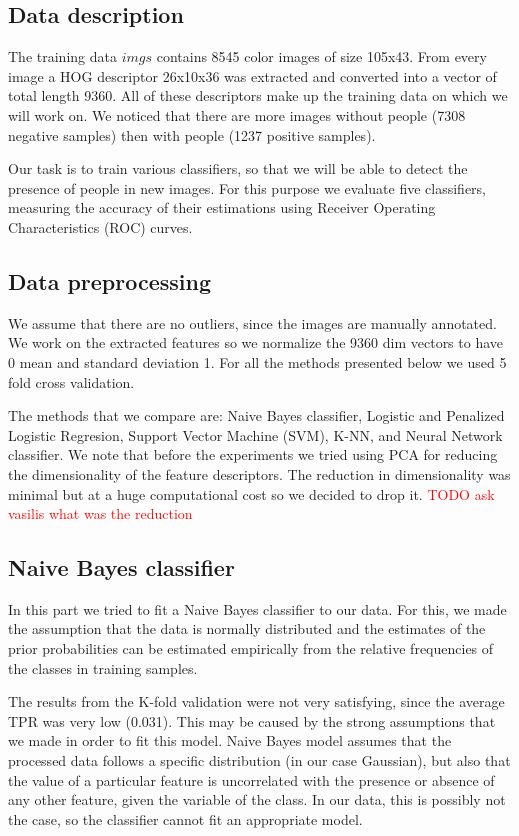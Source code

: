 \subsection{Data description}
The training data $imgs$ contains 8545 color images of size 105x43. From every image a HOG descriptor 26x10x36 was extracted and converted into a vector of total length 9360. All of these descriptors make up the training data on which we will work on.  We noticed that there are more images without people (7308 negative samples) then with people (1237 positive samples). 

\noindent Our task is to train various classifiers, so that we will be able to detect the presence of people in new images. For this purpose we evaluate five classifiers, measuring the accuracy of their estimations using Receiver Operating Characteristics (ROC) curves.

\subsection{Data preprocessing}
\noindent We assume that there are no outliers, since the images are manually annotated. We work on the extracted features so we normalize the 9360 dim vectors to have  0 mean and standard deviation 1. For all the methods presented below we used 5 fold cross validation.

\noindent The methods that we compare are: Naive Bayes classifier, Logistic and Penalized Logistic Regresion, Support Vector Machine (SVM),  K-NN, and Neural Network classifier. 
We note that before the experiments we tried using PCA for reducing the dimensionality of the feature descriptors. The reduction in dimensionality was minimal but at a huge computational cost so we decided to drop it.
\textcolor{red}{TODO ask vasilis what was the reduction}

\subsection{Naive Bayes classifier}
\noindent In this part we tried to fit a Naive Bayes classifier to our data. For this, we made the assumption that the data is normally distributed and the estimates of the prior probabilities can be estimated empirically from the relative frequencies of the classes in training samples.

\noindent The results from the K-fold validation were not very satisfying, since the average TPR was very low (0.031). This may be caused by the strong assumptions that we made in order to fit this model. Naive Bayes model assumes that the processed data follows a specific distribution (in our case Gaussian), but also that the value of a particular feature is uncorrelated with the presence or absence of any other feature, given the variable of the class. In our data, this is possibly not the case, so the classifier cannot fit an appropriate model.


